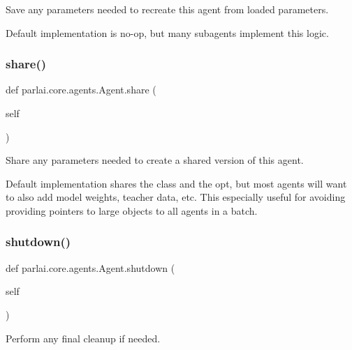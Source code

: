 \begin{DoxyVerb}Save any parameters needed to recreate this agent from loaded parameters.

Default implementation is no-op, but many subagents implement this logic.
\end{DoxyVerb}
 \mbox{\label{classparlai_1_1core_1_1agents_1_1Agent_afbbb06bf0f46ff927c8b186726a68b47}} 
\subsubsection{\texorpdfstring{share()}{share()}}
{\footnotesize\ttfamily def parlai.\+core.\+agents.\+Agent.\+share (\begin{DoxyParamCaption}\item[{}]{self }\end{DoxyParamCaption})}

\begin{DoxyVerb}Share any parameters needed to create a shared version of this agent.

Default implementation shares the class and the opt, but most agents will want
to also add model weights, teacher data, etc. This especially useful for
avoiding providing pointers to large objects to all agents in a batch.
\end{DoxyVerb}
 \mbox{\label{classparlai_1_1core_1_1agents_1_1Agent_a801e5ca2a5e8e96a72f0c04549008e8f}} 
\subsubsection{\texorpdfstring{shutdown()}{shutdown()}}
{\footnotesize\ttfamily def parlai.\+core.\+agents.\+Agent.\+shutdown (\begin{DoxyParamCaption}\item[{}]{self }\end{DoxyParamCaption})}

\begin{DoxyVerb}Perform any final cleanup if needed.
\end{DoxyVerb}
 \mbox{\label{classparlai_1_1core_1_1agents_1_1Agent_a005f62f977e8a7ebf91b9646307153bc}} 
